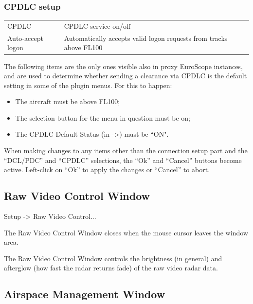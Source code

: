 \documentclass[a4paper,oneside,11pt]{memoir}
\begin{document}
\subsubsection*{CPDLC setup}

\begin{longtable}{p{2.5cm} p{10cm}}
  CPDLC               & CPDLC service on/off\\
  Auto-accept logon   & Automatically accepts valid logon requests from tracks above FL100\\
\end{longtable}

The following items are the only ones visible also in proxy EuroScope instances, and are used to determine whether sending a clearance via CPDLC is the default setting in some of the plugin menus. For this to happen:

\begin{itemize}
  \item The aircraft must be above FL100;
  \item The selection button for the menu in question must be on;
  \item The CPDLC Default Status (in ->) must be “ON".
\end{itemize}

When making changes to any items other than the connection setup part and the “DCL/PDC” and “CPDLC” selections, the “Ok” and “Cancel” buttons become active. Left-click on “Ok” to apply the changes or “Cancel” to abort.

\subsection{Raw Video Control Window}
\label{win:rvcw}

 Setup -> Raw Video Control...

\bigskip


The Raw Video Control Window closes when the mouse cursor leaves the window area.

\bigskip

The Raw Video Control Window controls the brightness (in general) and afterglow (how fast the radar returns fade) of the raw video radar data.

\subsection{Airspace Management Window}
\label{win:amw}
\end{document}
